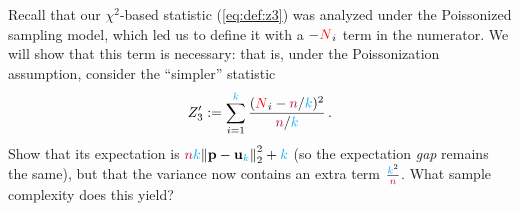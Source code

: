 \begin{question}
  Recall that our $\chi^2$-based statistic (\cref{eq:def:z3}) was analyzed under the Poissonized sampling model, which led us to define it with a $-\textcolor{red}{N}_i$ term in the numerator. We will show that this term is necessary: that is, under the Poissonization assumption, consider the ``simpler'' statistic
  \[
      Z'_3 := \sum_{i=1}^{\textcolor{cyan}{k}} \frac{(\textcolor{red}{N}_i-{\textcolor{purple}{n}}/{\textcolor{cyan}{k}})^2}{{\textcolor{purple}{n}}/{\textcolor{cyan}{k}}}\,.
  \]
  Show that its expectation is $\ns\ab\normtwo{\p-\uniform_\ab}^2 +\ab$ (so the expectation \emph{gap} remains the same), but that the variance now contains an extra term $\frac{{\textcolor{cyan}{k}}^2}{{\textcolor{purple}{n}}}$. What sample complexity does this yield?
\end{question}

